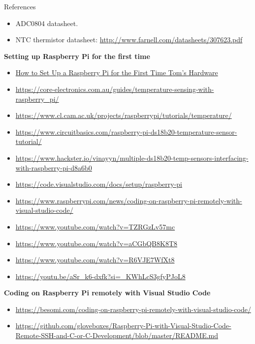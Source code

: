 \begin{labsection}{References}{}
  \begin{itemize}
    \item ADC0804 datasheet.
    \item NTC thermistor datasheet: \url{http://www.farnell.com/datasheets/307623.pdf}
  \end{itemize}

  \textbf{Setting up Raspberry Pi for the first time}\vspace{2pt}
  \begin{itemize}
    \item \href{https://www.tomshardware.com/how-to/set-up-raspberry-pi}{How to Set Up a Raspberry Pi for the First Time \textbar{} Tom's Hardware}
    \item \url{https://core-electronics.com.au/guides/temperature-sensing-with-raspberry_pi/}
    \item \url{https://www.cl.cam.ac.uk/projects/raspberrypi/tutorials/temperature/}
    \item \url{https://www.circuitbasics.com/raspberry-pi-ds18b20-temperature-sensor-tutorial/}
    \item \url{https://www.hackster.io/vinayyn/multiple-ds18b20-temp-sensors-interfacing-with-raspberry-pi-d8a6b0}
    \item \url{https://code.visualstudio.com/docs/setup/raspberry-pi}
    \item \url{https://www.raspberrypi.com/news/coding-on-raspberry-pi-remotely-with-visual-studio-code/}
    \item \url{https://www.youtube.com/watch?v=TZRGzLv57mc}
    \item \url{https://www.youtube.com/watch?v=aCGbQB8K8T8}
    \item \url{https://www.youtube.com/watch?v=R6VJE7WfXt8}
    \item \url{https://youtu.be/aSr_k6-dxfk?si=_KWhLcS3gfyPJoL8}
  \end{itemize}
  \vspace*{0.5em}

  \textbf{Coding on Raspberry Pi remotely with Visual Studio Code}\vspace{2pt}
  \begin{itemize}
    \item \url{https://besomi.com/coding-on-raspberry-pi-remotely-with-visual-studio-code/}
    \item \url{https://github.com/gloveboxes/Raspberry-Pi-with-Visual-Studio-Code-Remote-SSH-and-C-or-C-Development/blob/master/README.md}
  \end{itemize}
\end{labsection}
